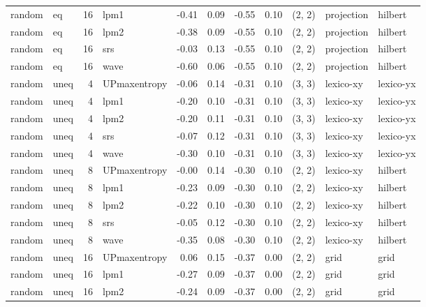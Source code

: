 \begin{tabular}{llrlrrrrlll}
random &    eq & 16 &         lpm1 & -0.41 &     0.09 &  -0.55 &       0.10 & (2, 2) &  projection &    hilbert \\
random &    eq & 16 &         lpm2 & -0.38 &     0.09 &  -0.55 &       0.10 & (2, 2) &  projection &    hilbert \\
random &    eq & 16 &          srs & -0.03 &     0.13 &  -0.55 &       0.10 & (2, 2) &  projection &    hilbert \\
random &    eq & 16 &         wave & -0.60 &     0.06 &  -0.55 &       0.10 & (2, 2) &  projection &    hilbert \\
random &  uneq &  4 & UPmaxentropy & -0.06 &     0.14 &  -0.31 &       0.10 & (3, 3) &   lexico-xy &  lexico-yx \\
random &  uneq &  4 &         lpm1 & -0.20 &     0.10 &  -0.31 &       0.10 & (3, 3) &   lexico-xy &  lexico-yx \\
random &  uneq &  4 &         lpm2 & -0.20 &     0.11 &  -0.31 &       0.10 & (3, 3) &   lexico-xy &  lexico-yx \\
random &  uneq &  4 &          srs & -0.07 &     0.12 &  -0.31 &       0.10 & (3, 3) &   lexico-xy &  lexico-yx \\
random &  uneq &  4 &         wave & -0.30 &     0.10 &  -0.31 &       0.10 & (3, 3) &   lexico-xy &  lexico-yx \\
random &  uneq &  8 & UPmaxentropy & -0.00 &     0.14 &  -0.30 &       0.10 & (2, 2) &   lexico-xy &    hilbert \\
random &  uneq &  8 &         lpm1 & -0.23 &     0.09 &  -0.30 &       0.10 & (2, 2) &   lexico-xy &    hilbert \\
random &  uneq &  8 &         lpm2 & -0.22 &     0.10 &  -0.30 &       0.10 & (2, 2) &   lexico-xy &    hilbert \\
random &  uneq &  8 &          srs & -0.05 &     0.12 &  -0.30 &       0.10 & (2, 2) &   lexico-xy &    hilbert \\
random &  uneq &  8 &         wave & -0.35 &     0.08 &  -0.30 &       0.10 & (2, 2) &   lexico-xy &    hilbert \\
random &  uneq & 16 & UPmaxentropy &  0.06 &     0.15 &  -0.37 &       0.00 & (2, 2) &        grid &       grid \\
random &  uneq & 16 &         lpm1 & -0.27 &     0.09 &  -0.37 &       0.00 & (2, 2) &        grid &       grid \\
random &  uneq & 16 &         lpm2 & -0.24 &     0.09 &  -0.37 &       0.00 & (2, 2) &        grid &       grid \\

\end{tabular}
